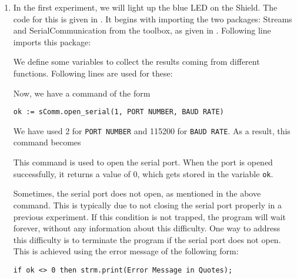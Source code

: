 \begin{enumerate}
  \item In the first experiment, we will light up the blue LED on the
        Shield.  The code for this is given in .
        It begins with importing the two packages: Streams and SerialCommunication from the toolbox, as 
        given in . Following line imports this package: 
        

    We define some variables to collect the results coming from different functions. Following 
    lines are used for these:
    

    Now, we have a command of the form 
        \begin{lstlisting}[style=nonumbers]
     ok := sComm.open_serial(1, PORT NUMBER, BAUD RATE)
  \end{lstlisting}
        We have used 2 for {\tt PORT NUMBER} and 115200 for {\tt BAUD RATE}.
        As a result, this command becomes 
        
        This command is used to open the serial port.  When the port is
        opened successfully, it returns a value of 0, which gets stored in
        the variable {\tt ok}.
        
        Sometimes, the serial port does not open, as mentioned in the above
        command.  This is typically due to not closing the serial port
        properly in a previous experiment.  If this condition is not
        trapped, the program will wait forever, without any information
        about this difficulty.  One way to address this difficulty is to
        terminate the program if the serial port does not open.  This is
        achieved using the error message of the following form:
        \begin{lstlisting}[style=nonumbers]
            if ok <> 0 then strm.print(Error Message in Quotes);
        \end{lstlisting}


\end{enumerate}
